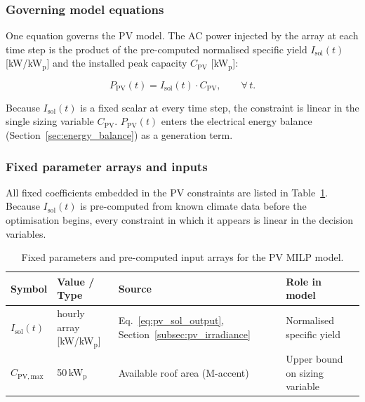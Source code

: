 \documentclass[11pt,a4paper]{report}
\begin{document}
\subsubsection{Governing model equations}
\label{sub:pv_equations}

One equation governs the PV model.
The AC power injected by the array at each time step is the product of the
pre-computed normalised specific yield $I_\mathrm{sol}(t)$ [kW/kW$_\mathrm{p}$]
and the installed peak capacity $C_\mathrm{PV}$ [kW$_\mathrm{p}$]:

\begin{equation}
    P_\mathrm{PV}(t) = I_\mathrm{sol}(t)\cdot C_\mathrm{PV},
    \qquad \forall\, t.
    \label{eq:pv_power}
\end{equation}

\noindent Because $I_\mathrm{sol}(t)$ is a fixed scalar at every time step,
the constraint is linear in the single sizing variable $C_\mathrm{PV}$.
$P_\mathrm{PV}(t)$ enters the electrical energy balance
(Section~\ref{sec:energy_balance}) as a generation term.

\subsubsection{Fixed parameter arrays and inputs}
\label{sub:pv_params}

All fixed coefficients embedded in the PV constraints are listed in
Table~\ref{tab:pv_inputs}.
Because $I_\mathrm{sol}(t)$ is pre-computed from known climate data before the
optimisation begins, every constraint in which it appears is linear in the decision
variables.

\begin{table}[H]
\centering
\caption{Fixed parameters and pre-computed input arrays for the PV MILP model.}
\label{tab:pv_inputs}
\begin{tabular}{lllp{4.8cm}}
\hline
\textbf{Symbol} & \textbf{Value / Type} & \textbf{Source} & \textbf{Role in model} \\
\hline
$I_\mathrm{sol}(t)$ & hourly array [kW/kW$_\mathrm{p}$]
    & Eq.~\eqref{eq:pv_sol_output}, Section~\ref{subsec:pv_irradiance}
    & Normalised specific yield \\
$C_\mathrm{PV,max}$ & 50\,kW$_\mathrm{p}$
    & Available roof area (M-accent)
    & Upper bound on sizing variable \\

\hline
\end{tabular}
\end{table}
\end{document}

